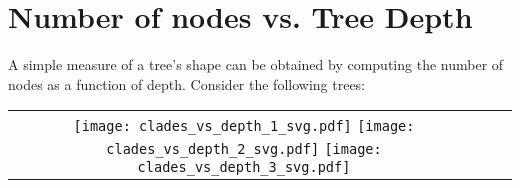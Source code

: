 \section{Number of nodes vs. Tree Depth}
\label{clades_vs_depth}

A simple measure of a tree's shape can be obtained by computing the number of
nodes as a function of depth. Consider the following trees:

\begin{tabular}{ccc}
\texttt{[image: clades\_vs\_depth\_1\_svg.pdf]}
\texttt{[image: clades\_vs\_depth\_2\_svg.pdf]}
\texttt{[image: clades\_vs\_depth\_3\_svg.pdf]}
\end{tabular}
